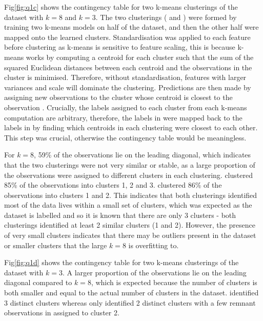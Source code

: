     Fig\eqref{fig:q1c} shows the contingency table for two k-means clusterings of the dataset with $k=8$ and $k=3$.
    The two clusterings ( and ) were formed by training two k-means models on
    half of the dataset, and then the other half were mapped onto the learned clusters.
    Standardisation was applied to each feature before clustering as k-means is sensitive to feature scaling, this is because
    k-means works by computing a centroid for each cluster such that the sum of the squared Euclidean distances between
    each centroid and the observations in the cluster is minimised.
    Therefore, without standardisation, features with larger variances and scale will dominate the clustering.
    Predictions are then made by assigning new observations to the cluster whose centroid is closest to the
    observation \cite{sklearn-k-means}.
    Crucially, the labels assigned to each cluster from each k-means computation are arbitrary, therefore, the labels
    in  were mapped back to the labels in  by finding which centroids in each
    clustering were closest to each other.
    This step was crucial, otherwise the contingency table would be meaningless.

    For $k=8$, 59\% of the observations lie on the leading diagonal, which indicates that the two clusterings were not very
    similar or stable, as a large proportion of the observations were assigned to different clusters in each clustering.
     clustered 85\% of the observations into clusters 1, 2 and 3.
     clustered 86\% of the observations into clusters 1 and 2.
    This indicates that both clusterings identified most of the data lives within a small set of clusters, which was
    expected as the dataset is labelled and so it is known that there are only 3 clusters - both clusterings identified
    at least 2 similar clusters (1 and 2).
    However, the presence of very small clusters indicates that there may be outliers present in the dataset or smaller
    clusters that the large $k=8$ is overfitting to.

    Fig\eqref{fig:q1d} shows the contingency table for two k-means clusterings of the dataset with $k=3$.
    A larger proportion of the observations lie on the leading diagonal compared to $k=8$, which is expected because
    the number of clusters is both smaller and equal to the actual number of clusters in the dataset.
     identified 3 distinct clusters whereas  only identified 2 distinct
    clusters with a few remnant observations in assigned to cluster 2.

